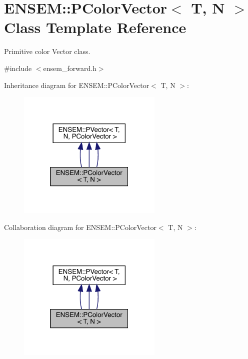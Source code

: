 \hypertarget{classENSEM_1_1PColorVector}{}\section{E\+N\+S\+EM\+:\+:P\+Color\+Vector$<$ T, N $>$ Class Template Reference}
\label{classENSEM_1_1PColorVector}


Primitive color Vector class.  




{\ttfamily \#include $<$ensem\+\_\+forward.\+h$>$}



Inheritance diagram for E\+N\+S\+EM\+:\+:P\+Color\+Vector$<$ T, N $>$\+:
\nopagebreak
\begin{figure}[H]
\begin{center}
\leavevmode
\includegraphics[width=196pt]{dd/df3/classENSEM_1_1PColorVector__inherit__graph}
\end{center}
\end{figure}


Collaboration diagram for E\+N\+S\+EM\+:\+:P\+Color\+Vector$<$ T, N $>$\+:
\nopagebreak
\begin{figure}[H]
\begin{center}
\leavevmode
\includegraphics[width=196pt]{d2/d34/classENSEM_1_1PColorVector__coll__graph}
\end{center}
\end{figure}
